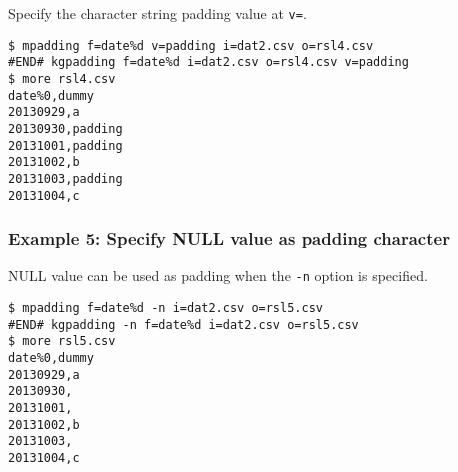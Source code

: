 Specify the character string padding value at \verb|v=|.


\begin{Verbatim}[baselinestretch=0.7,frame=single]
$ mpadding f=date%d v=padding i=dat2.csv o=rsl4.csv
#END# kgpadding f=date%d i=dat2.csv o=rsl4.csv v=padding
$ more rsl4.csv
date%0,dummy
20130929,a
20130930,padding
20131001,padding
20131002,b
20131003,padding
20131004,c
\end{Verbatim}
\subsubsection*{Example 5: Specify NULL value as padding character}

NULL value can be used as padding when the \verb|-n| option is specified.


\begin{Verbatim}[baselinestretch=0.7,frame=single]
$ mpadding f=date%d -n i=dat2.csv o=rsl5.csv
#END# kgpadding -n f=date%d i=dat2.csv o=rsl5.csv
$ more rsl5.csv
date%0,dummy
20130929,a
20130930,
20131001,
20131002,b
20131003,
20131004,c
\end{Verbatim}
